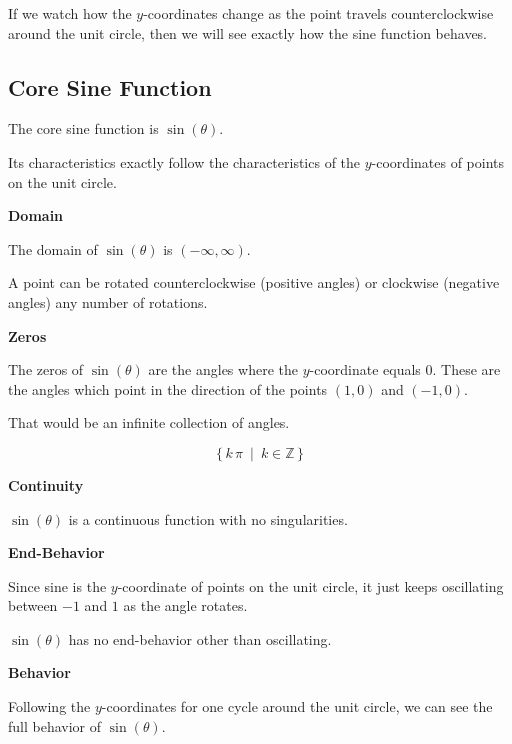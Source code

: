 \documentclass{ximera}
\begin{document}
If we watch how the $y$-coordinates change as the point travels counterclockwise around the unit circle, then we will see exactly how the sine function behaves.






\subsection*{Core Sine Function}



The core sine function is $\sin(\theta)$.

Its characteristics exactly follow the characteristics of the $y$-coordinates of points on the unit circle.






\textbf{\textcolor{blue!55!black}{Domain}}

The domain of $\sin(\theta)$ is $(-\infty, \infty)$.

A point can be rotated counterclockwise (positive angles) or clockwise (negative angles) any number of rotations.



\textbf{\textcolor{blue!55!black}{Zeros}}


The zeros of $\sin(\theta)$ are the angles where the $y$-coordinate equals $0$.  These are the angles which point in the direction of the points $(1,0)$ and $(-1,0)$.

That would be an infinite collection of angles.

\[
\{ \, k \, \pi \, \text{ | } \,  k \in \mathbb{Z} \,  \}
\]



\textbf{\textcolor{blue!55!black}{Continuity}}


$\sin(\theta)$ is a continuous function with no singularities.




\textbf{\textcolor{blue!55!black}{End-Behavior}}



Since sine is the $y$-coordinate of points on the unit circle, it just keeps oscillating between $-1$ and $1$ as the angle rotates.

$\sin(\theta)$ has no end-behavior other than oscillating.




\textbf{\textcolor{blue!55!black}{Behavior}}


Following the $y$-coordinates for one cycle around the unit circle, we can see the full behavior of $\sin(\theta)$.
\end{document}
